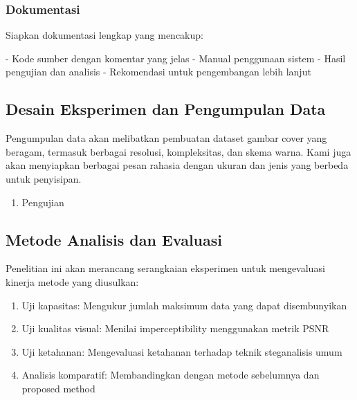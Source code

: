 \documentclass{ittelkom}
\begin{document}
\subsubsection{Dokumentasi}

Siapkan dokumentasi lengkap yang mencakup:

- Kode sumber dengan komentar yang jelas
- Manual penggunaan sistem
- Hasil pengujian dan analisis
- Rekomendasi untuk pengembangan lebih lanjut

\subsection{Desain Eksperimen dan Pengumpulan Data}

Pengumpulan data akan melibatkan pembuatan dataset gambar cover yang beragam,
termasuk berbagai resolusi, kompleksitas, dan skema warna. Kami juga akan
menyiapkan berbagai pesan rahasia dengan ukuran dan jenis yang berbeda untuk
penyisipan.

\begin{enumerate}
    \item Pengujian
\end{enumerate}

\subsection{Metode Analisis dan Evaluasi}

Penelitian ini akan merancang serangkaian eksperimen untuk mengevaluasi kinerja
metode yang diusulkan:
\begin{enumerate}
    \item Uji kapasitas: Mengukur jumlah maksimum data yang dapat disembunyikan
    \item Uji kualitas visual: Menilai imperceptibility menggunakan metrik PSNR
    \item Uji ketahanan: Mengevaluasi ketahanan terhadap teknik steganalisis umum
    \item Analisis komparatif: Membandingkan dengan metode sebelumnya dan proposed method
\end{enumerate}


\end{document}
